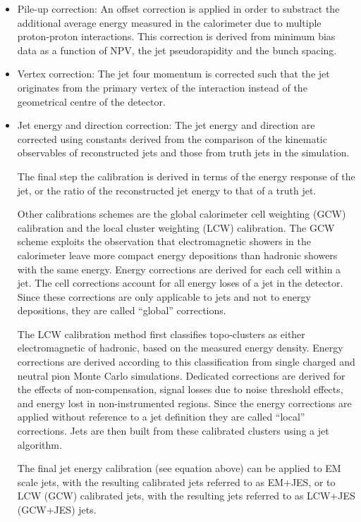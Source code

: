\begin{itemize}
\item
Pile-up correction: An offset correction is applied in order to substract the additional average energy measured in the calorimeter due to multiple proton-proton interactions. This correction is derived from minimum bias data as a function of NPV, the jet pseudorapidity and the bunch spacing.
\item
Vertex correction: The jet four momentum is corrected such that the jet originates from the primary vertex of the interaction instead of the geometrical centre of the detector. 
\item
Jet energy and direction correction: The jet energy and direction are corrected using constants derived from the comparison of the kinematic observables of reconstructed jets and those from truth jets in the simulation.

The final step the calibration is derived in terms of the energy response of the jet, or the ratio of the reconstructed jet energy to that of a truth jet. 

Other calibrations schemes are the global calorimeter cell weighting (GCW) calibration and the local cluster weighting (LCW) calibration.  The GCW scheme exploits the observation that electromagnetic showers in the calorimeter leave more compact energy depositions than hadronic showers with the same energy.  Energy corrections are derived for each cell within a jet.  The cell corrections account for all energy loses of a jet in the detector. Since these corrections are only applicable to jets and not to energy depositions, they are called ``global'' corrections.

The LCW calibration method first classifies topo-clusters as either electromagnetic of hadronic, based on the measured energy density. Energy corrections are derived according to this classification from single charged and neutral pion Monte Carlo simulations. Dedicated corrections are derived for the effects of non-compensation, signal losses due to noise threshold effects, and energy lost in non-instrumented regions. Since the energy corrections are applied without reference to a jet definition they are called ``local'' corrections. Jets are then built from these calibrated clusters using a jet algorithm.  

The final jet energy calibration (see equation above) can be applied to EM scale jets, with the resulting calibrated jets referred to as EM+JES, or to LCW (GCW) calibrated jets, with the resulting jets referred to as LCW+JES (GCW+JES) jets.


\end{itemize}

